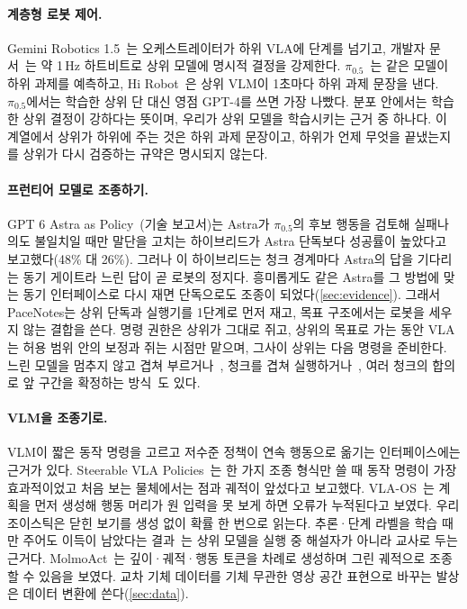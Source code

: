 \paragraph{계층형 로봇 제어.}
Gemini Robotics 1.5~\cite{geminirobotics15_2025}는 오케스트레이터가 하위 VLA에 단계를 넘기고, 개발자 문서~\cite{geminier_docs2026}는 약 1\,Hz 하트비트로 상위 모델에 명시적 결정을 강제한다. $\pi_{0.5}$~\cite{pi05_2025}는 같은 모델이 하위 과제를 예측하고, Hi Robot~\cite{hirobot2025}은 상위 VLM이 1초마다 하위 과제 문장을 낸다. $\pi_{0.5}$에서는 학습한 상위 단 대신 영점 GPT-4를 쓰면 가장 나빴다. 분포 안에서는 학습한 상위 결정이 강하다는 뜻이며, 우리가 상위 모델을 학습시키는 근거 중 하나다. 이 계열에서 상위가 하위에 주는 것은 하위 과제 문장이고, 하위가 언제 무엇을 끝냈는지를 상위가 다시 검증하는 규약은 명시되지 않는다.

\paragraph{프런티어 모델로 조종하기.}
GPT 6 Astra as Policy~\cite{su2026astra}(기술 보고서)는 Astra가 $\pi_{0.5}$의 후보 행동을 검토해 실패나 의도 불일치일 때만 말단을 고치는 하이브리드가 Astra 단독보다 성공률이 높았다고 보고했다(48\% 대 26\%). 그러나 이 하이브리드는 청크 경계마다 Astra의 답을 기다리는 동기 게이트라 느린 답이 곧 로봇의 정지다. 흥미롭게도 같은 Astra를 그 방법에 맞는 동기 인터페이스로 다시 재면 단독으로도 조종이 되었다(\cref{sec:evidence}). 그래서 PaceNotes는 상위 단독과 실행기를 1단계로 먼저 재고, 목표 구조에서는 로봇을 세우지 않는 결합을 쓴다. 명령 권한은 상위가 그대로 쥐고, 상위의 목표로 가는 동안 VLA는 허용 범위 안의 보정과 쥐는 시점만 맡으며, 그사이 상위는 다음 명령을 준비한다. 느린 모델을 멈추지 않고 겹쳐 부르거나~\cite{slowbrain2026}, 청크를 겹쳐 실행하거나~\cite{black2025rtc}, 여러 청크의 합의로 앞 구간을 확정하는 방식~\cite{a3commit2026}도 있다.

\paragraph{VLM을 조종기로.}
VLM이 짧은 동작 명령을 고르고 저수준 정책이 연속 행동으로 옮기는 인터페이스에는 근거가 있다. Steerable VLA Policies~\cite{steerable2026}는 한 가지 조종 형식만 쓸 때 동작 명령이 가장 효과적이었고 처음 보는 물체에서는 점과 궤적이 앞섰다고 보고했다. VLA-OS~\cite{vlaos2025}는 계획을 먼저 생성해 행동 머리가 원 입력을 못 보게 하면 오류가 누적된다고 보였다. 우리 조이스틱은 닫힌 보기를 생성 없이 확률 한 번으로 읽는다. 추론·단계 라벨을 학습 때만 주어도 이득이 남았다는 결과~\cite{ecotlite2025}는 상위 모델을 실행 중 해설자가 아니라 교사로 두는 근거다. MolmoAct~\cite{molmoact2026}는 깊이·궤적·행동 토큰을 차례로 생성하며 그린 궤적으로 조종할 수 있음을 보였다. 교차 기체 데이터를 기체 무관한 영상 공간 표현으로 바꾸는 발상은 데이터 변환에 쓴다(\cref{sec:data}).

